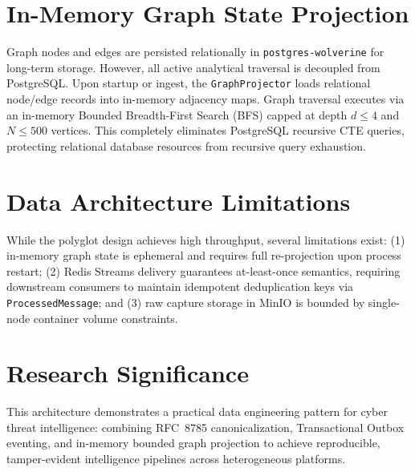\section{In-Memory Graph State Projection}
\label{sec:graph_state_persistence}

Graph nodes and edges are persisted relationally in \texttt{postgres-wolverine} for long-term storage. However, all active analytical traversal is decoupled from PostgreSQL. Upon startup or ingest, the \texttt{GraphProjector} loads relational node/edge records into in-memory adjacency maps. Graph traversal executes via an in-memory Bounded Breadth-First Search (BFS) capped at depth $d \le 4$ and $N \le 500$ vertices. This completely eliminates PostgreSQL recursive CTE queries, protecting relational database resources from recursive query exhaustion.

\section{Data Architecture Limitations}
\label{sec:data_limitations}

While the polyglot design achieves high throughput, several limitations exist: (1) in-memory graph state is ephemeral and requires full re-projection upon process restart; (2) Redis Streams delivery guarantees at-least-once semantics, requiring downstream consumers to maintain idempotent deduplication keys via \texttt{ProcessedMessage}; and (3) raw capture storage in MinIO is bounded by single-node container volume constraints.

\section{Research Significance}
\label{sec:data_significance}

This architecture demonstrates a practical data engineering pattern for cyber threat intelligence: combining RFC~8785 canonicalization, Transactional Outbox eventing, and in-memory bounded graph projection to achieve reproducible, tamper-evident intelligence pipelines across heterogeneous platforms.
